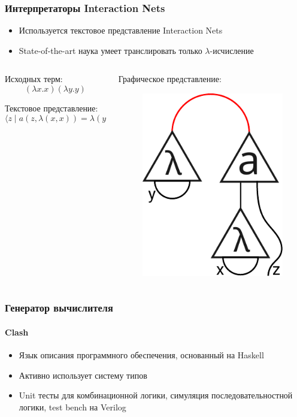 \documentclass[aspectratio=169]{beamer}
\begin{document}
\begin{frame}
    \frametitle{Интерпретаторы Interaction Nets}

    \begin{itemize}
        \item Используется текстовое представление Interaction Nets
        \item State-of-the-art наука умеет транслировать только $\lambda$-исчисление
    \end{itemize}

    \vspace{1em}

    \begin{columns}[t]
        \begin{column}{0.5\linewidth}
            Исходных терм: \[(\lambda x. x) (\lambda y. y)\]

            Текстовое представление:
            \[\big\langle z \mid a(z, \lambda(x, x)) = \lambda(y, y) \big\rangle\]
        \end{column}
        \begin{column}{0.5\linewidth}
            Графическое представление:
            \begin{figure}
                \includegraphics[width=0.4\linewidth]{pictures/lamda-graph.pdf}
            \end{figure}
        \end{column}
    \end{columns}

\end{frame}

\begin{frame}
    \frametitle{Генератор вычислителя}
    \framesubtitle{Clash}

    \begin{itemize}
        \item Язык описания программного обеспечения, основанный на Haskell
        \item Активно использует систему типов
        \item Unit тесты для комбинационной логики, симуляция последовательностной логики, test bench на Verilog

    \end{itemize}
\end{frame}
\end{document}
